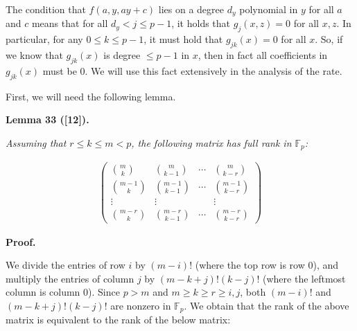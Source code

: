 The condition that $f(a,y,ay+c)$ lies on a degree $d_{y}$ polynomial in $y$ for all $a$ and $c$ means that for all $d_{y}<j\leq p-1$, it holds that $g_{j}(x,z)=0$ for all $x,z$. In particular, for any $0\leq k\leq p-1$, it must hold that $g_{jk}(x)=0$ for all $x$. So, if we know that $g_{jk}(x)$ is degree $\leq p-1$ in $x$, then in fact all coefficients in $g_{jk}(x)$ must be $0$. We will use this fact extensively in the analysis of the rate.\par




First, we will need the following lemma.\par





\par\medskip\noindent\textbf{
\textbf{Lemma 33}\textbf{ }([12])\textbf{.}
}\par



\emph{Assuming that $r\leq k\leq m<p$, the following matrix has full rank in $\mathbb{F}_{p}$:}\par


\[\begin{gathered}
\begin{pmatrix}\binom{m}{k}&\binom{m}{k-1}&\cdots&\binom{m}{k-r}\\
\binom{m-1}{k}&\binom{m-1}{k-1}&\cdots&\binom{m-1}{k-r}\\
\vdots&\vdots&&\vdots\\
\binom{m-r}{k}&\binom{m-r}{k-1}&\cdots&\binom{m-r}{k-r}\end{pmatrix}
\end{gathered}\]






\par\medskip\noindent\textbf{Proof.}\par




We divide the entries of row $i$ by $(m-i)!$ (where the top row is row $0$), and multiply the entries of column $j$ by $(m-k+j)!(k-j)!$ (where the leftmost column is column $0$). Since $p>m$ and $m\geq k\geq r\geq i,j$, both $(m-i)!$ and $(m-k+j)!(k-j)!$ are nonzero in $\mathbb{F}_{p}$. We obtain that the rank of the above matrix is equivalent to the rank of the below matrix:\par


